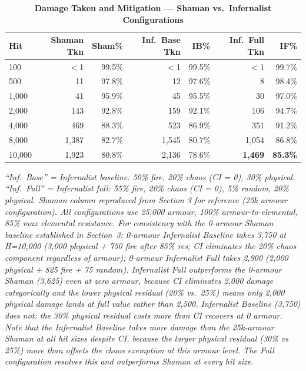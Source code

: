 \documentclass[12pt, letterpaper]{article}
\begin{document}
\begin{table}[htbp]
\centering
\caption{\textbf{Damage Taken and Mitigation --- Shaman vs.\ Infernalist Configurations}}
{\small
\begin{tabular}{lrrrrrr}
\toprule
\textbf{Hit} & \textbf{Shaman Tkn} & \textbf{Sham\%} & \textbf{Inf.\ Base Tkn} & \textbf{IB\%} & \textbf{Inf.\ Full Tkn} & \textbf{IF\%} \\
\midrule
\rowcolor{rowalt} 100 & $<$1 & \cellcolor{tierS}99.5\% & $<$1 & \cellcolor{tierS}99.5\% & $<$1 & \cellcolor{tierS}99.7\% \\
500 & 11 & \cellcolor{tierS}97.8\% & 12 & \cellcolor{tierS}97.6\% & 8 & \cellcolor{tierS}98.4\% \\
\rowcolor{rowalt} 1{,}000 & 41 & \cellcolor{tierS}95.9\% & 45 & \cellcolor{tierS}95.5\% & 30 & \cellcolor{tierS}97.0\% \\
2{,}000 & 143 & \cellcolor{tierA}92.8\% & 159 & \cellcolor{tierA}92.1\% & 106 & \cellcolor{tierA}94.7\% \\
\rowcolor{rowalt} 4{,}000 & 469 & \cellcolor{tierB}88.3\% & 523 & \cellcolor{tierB}86.9\% & 351 & \cellcolor{tierA}91.2\% \\
8{,}000 & 1{,}387 & \cellcolor{tierB}82.7\% & 1{,}545 & \cellcolor{tierB}80.7\% & 1{,}054 & \cellcolor{tierB}86.8\% \\
\midrule
\rowcolor{rowhi}10{,}000 & 1{,}923 & \cellcolor{tierB}80.8\% & 2{,}136 & \cellcolor{tierB}78.6\% & \textbf{1{,}469} & \cellcolor{tierB}\textbf{85.3\%} \\
\bottomrule
\end{tabular}
}
\smallskip
\begin{minipage}{\linewidth}
\small\textit{``Inf.\ Base'' = Infernalist baseline: 50\% fire, 20\% chaos (CI = 0), 30\% physical. ``Inf.\ Full'' = Infernalist full: 55\% fire, 20\% chaos (CI = 0), 5\% random, 20\% physical. Shaman column reproduced from Section 3 for reference (25k armour configuration). All configurations use 25{,}000 armour, 100\% armour-to-elemental, 85\% max elemental resistance. For consistency with the 0-armour Shaman baseline established in Section~3: 0-armour Infernalist Baseline takes 3{,}750 at H=10{,}000 (3{,}000 physical + 750 fire after 85\% res; CI eliminates the 20\% chaos component regardless of armour); 0-armour Infernalist Full takes 2{,}900 (2{,}000 physical + 825 fire + 75 random). Infernalist Full outperforms the 0-armour Shaman (3{,}625) even at zero armour, because CI eliminates 2{,}000 damage categorically and the lower physical residual (20\% vs.\ 25\%) means only 2{,}000 physical damage lands at full value rather than 2{,}500. Infernalist Baseline (3{,}750) does not: the 30\% physical residual costs more than CI recovers at 0 armour. Note that the Infernalist Baseline takes \textit{more} damage than the 25k-armour Shaman at all hit sizes despite CI, because the larger physical residual (30\% vs 25\%) more than offsets the chaos exemption at this armour level. The Full configuration resolves this and outperforms Shaman at every hit size.}
\end{minipage}
\end{table}
\end{document}
